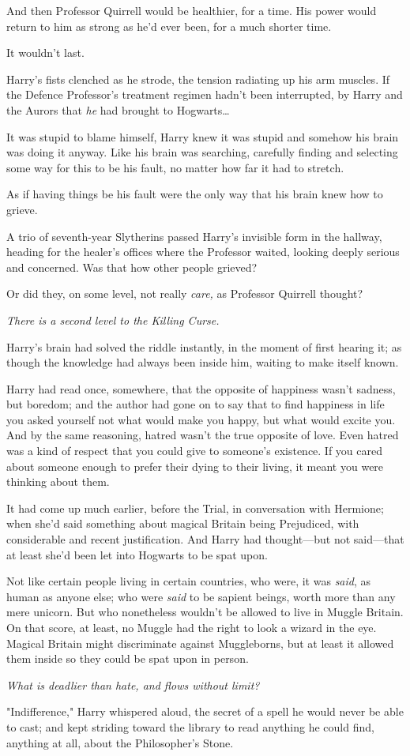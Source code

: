 And then Professor Quirrell would be healthier, for a time. His power would
return to him as strong as he'd ever been, for a much shorter time.

It wouldn't last.

Harry's fists clenched as he strode, the tension radiating up his arm muscles.
If the Defence Professor's treatment regimen hadn't been interrupted, by Harry
and the Aurors that \emph{he} had brought to Hogwarts…

It was stupid to blame himself, Harry knew it was stupid and somehow his brain
was doing it anyway. Like his brain was searching, carefully finding and
selecting some way for this to be his fault, no matter how far it had to
stretch.

As if having things be his fault were the only way that his brain knew how to
grieve.

A trio of seventh-year Slytherins passed Harry's invisible form in the hallway,
heading for the healer's offices where the Professor waited, looking deeply
serious and concerned. Was that how other people grieved?

Or did they, on some level, not really \emph{care,} as Professor Quirrell
thought?

\emph{There is a second level to the Killing Curse.}

Harry's brain had solved the riddle instantly, in the moment of first hearing
it; as though the knowledge had always been inside him, waiting to make itself
known.

Harry had read once, somewhere, that the opposite of happiness wasn't sadness,
but boredom; and the author had gone on to say that to find happiness in life
you asked yourself not what would make you happy, but what would excite you.
And by the same reasoning, hatred wasn't the true opposite of love. Even hatred
was a kind of respect that you could give to someone's existence. If you cared
about someone enough to prefer their dying to their living, it meant you were
thinking about them.

It had come up much earlier, before the Trial, in conversation with Hermione;
when she'd said something about magical Britain being Prejudiced, with
considerable and recent justification. And Harry had thought—but not
said—that at least she'd been let into Hogwarts to be spat upon.

Not like certain people living in certain countries, who were, it was
\emph{said}, as human as anyone else; who were \emph{said} to be sapient
beings, worth more than any mere unicorn. But who nonetheless wouldn't be
allowed to live in Muggle Britain. On that score, at least, no Muggle had the
right to look a wizard in the eye. Magical Britain might discriminate against
Muggleborns, but at least it allowed them inside so they could be spat upon in
person.

\emph{What is deadlier than hate, and flows without limit?}

"Indifference," Harry whispered aloud, the secret of a spell he would never be
able to cast; and kept striding toward the library to read anything he could
find, anything at all, about the Philosopher's Stone.
